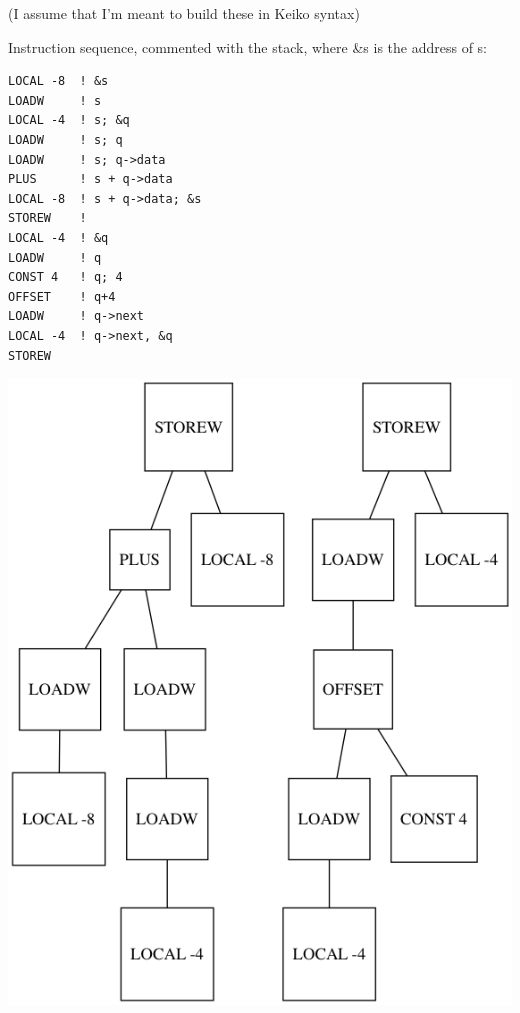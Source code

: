 (I assume that I'm meant to build these in Keiko syntax)

Instruction sequence, commented with the stack, where \&s is the address of s:

\begin{lstlisting}
LOCAL -8  ! &s
LOADW     ! s
LOCAL -4  ! s; &q
LOADW     ! s; q
LOADW     ! s; q->data
PLUS      ! s + q->data
LOCAL -8  ! s + q->data; &s
STOREW    !
LOCAL -4  ! &q
LOADW     ! q
CONST 4   ! q; 4
OFFSET    ! q+4
LOADW     ! q->next
LOCAL -4  ! q->next, &q
STOREW
\end{lstlisting}

\includegraphics[width=\textwidth]{ex3.png}
